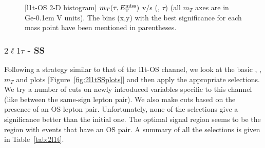 \documentclass[letterpaper,12pt]{article}
\newcommand{\GeV}{{Ge\kern -0.1em V}}
\begin{document}
\begin{figure}[h!]
{    %
  }
  \makebox[\textwidth][c]{
    \rule{0pt}{0.2cm}
  }
  \caption[(\2l1t-OS 2-D histogram) $m_{T} (\tau, \met)$ v/s \DeltaR{} (\ls, $\tau$)]{[\2l1t-OS 2-D histogram] $m_{T} (\tau, \met)$ v/s \DeltaR{} (\ls, $\tau$) (all $m_{T}$ axes are in \GeV{} units). The bins (x,y) with the best significance for each mass point have been mentioned in parentheses.}
  \label{fig:2l1t2d3}
  \vspace{0.4cm}
  \makebox[0pt][c]{
  }
\end{figure}

\subsubsection{{\Large{\boldmath$2\ell1\tau$} - SS}}
\label{sec:2l1tSS}

Following a strategy similar to that of the \2l1t-OS channel, we look at the basic \pt, \DeltaR, $m_{T}$ and \Lt{} plots [Figure~\ref{fig:2l1tSSplots}] and then apply the appropriate selections. We try a number of cuts on newly introduced variables specific to this channel (like \DeltaR{} between the same-sign lepton pair). We also make cuts based on the presence of an OS lepton pair. Unfortunately, none of the selections give a significance better than the initial one. The optimal signal region seems to be the region with events that have an OS pair. A summary of all the selections is given in Table~\ref{tab:2l1t}.
\end{document}
